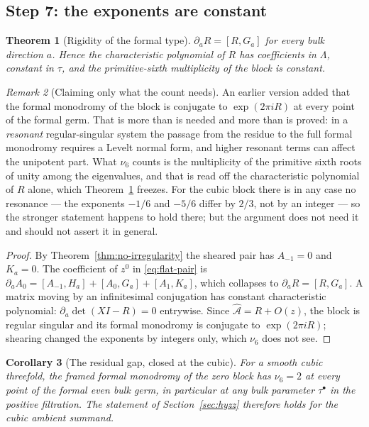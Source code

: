 \documentclass[11pt]{article}
\newtheorem{theorem}{Theorem}
\newtheorem{corollary}[theorem]{Corollary}
\theoremstyle{definition}
\theoremstyle{remark}
\newtheorem{remark}[theorem]{Remark}
\begin{document}
\subsection*{Step 7: the exponents are constant}

\begin{theorem}[Rigidity of the formal type]
\label{thm:rigidity}
$\partial_aR=[R,G_a]$ for every bulk direction $a$. Hence the characteristic
polynomial of $R$ has coefficients in $\Lambda$, constant in $\tau$, and the
primitive-sixth multiplicity of the block is constant.
\end{theorem}

\begin{remark}[Claiming only what the count needs]
\label{rem:no-levelt}
An earlier version added that the formal monodromy of the block is conjugate to
$\exp(2\pi iR)$ at every point of the formal germ. That is more than is needed and
more than is proved: in a \emph{resonant} regular-singular system the passage from
the residue to the full formal monodromy requires a Levelt normal form, and higher
resonant terms can affect the unipotent part. What $\nu_6$ counts is the
multiplicity of the primitive sixth roots of unity among the eigenvalues, and
that is read off the characteristic polynomial of $R$ alone, which
Theorem~\ref{thm:rigidity} freezes. For the cubic block there is in any case no
resonance --- the exponents $-1/6$ and $-5/6$ differ by $2/3$, not by an integer
--- so the stronger statement happens to hold there; but the argument does not
need it and should not assert it in general.
\end{remark}

\begin{proof}
By Theorem~\ref{thm:no-irregularity} the sheared pair has $A_{-1}=0$ and
$K_a=0$. The coefficient of $z^0$ in \eqref{eq:flat-pair} is
$\partial_aA_0=[A_{-1},H_a]+[A_0,G_a]+[A_1,K_a]$, which collapses to
$\partial_aR=[R,G_a]$. A matrix moving by an infinitesimal conjugation has
constant characteristic polynomial: $\partial_a\det(XI-R)=0$ entrywise. Since
$\widehat{\mathcal A}=R+O(z)$, the block is regular singular and its formal
monodromy is conjugate to $\exp(2\pi iR)$; shearing changed the exponents by
integers only, which $\nu_6$ does not see.
\end{proof}

\begin{corollary}[The residual gap, closed at the cubic]
\label{cor:cubic-closed}
For a smooth cubic threefold, the framed formal monodromy of the zero block has
$\nu_6=2$ at every point of the formal even bulk germ, in particular at any
bulk parameter $\tau^\bullet$ in the positive filtration. The statement of
Section~\ref{sec:hyzz} therefore holds for the cubic ambient summand.
\end{corollary}
\end{document}
